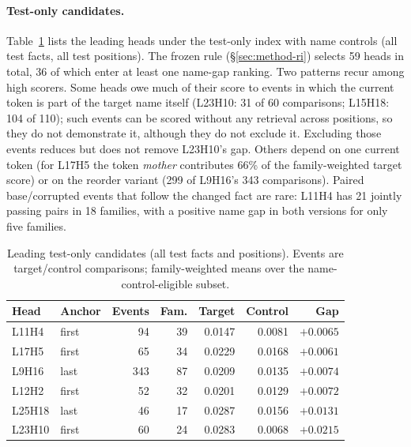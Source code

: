 \paragraph{Test-only candidates.}
Table~\ref{tab:ricands} lists the leading heads under the test-only index with name
controls (all test facts, all test positions). The frozen rule (\S\ref{sec:method-ri})
selects 59 heads in total, 36 of which enter at least one name-gap ranking. Two
patterns recur among high scorers. Some heads owe much of their score to events in
which the current token is part of the target name itself (L23H10: 31 of 60
comparisons; L15H18: 104 of 110); such events can be scored without any retrieval
across positions, so they do not demonstrate it, although they do not exclude it.
Excluding those events reduces but does not remove L23H10's gap. Others depend on one current token (for L17H5 the
token \emph{mother} contributes 66\% of the family-weighted target score) or on the
reorder variant (299 of L9H16's 343 comparisons). Paired base/corrupted events
that follow the changed fact are rare: L11H4 has 21 jointly passing pairs in 18
families, with a positive name gap in both versions for only five families.

\begin{table}[h]
\centering\scriptsize
\setlength{\tabcolsep}{3pt}
\begin{tabular}{@{}llrrrrr@{}}
\toprule
Head & Anchor & Events & Fam. & Target & Control & Gap \\
\midrule
L11H4  & first & 94  & 39 & 0.0147 & 0.0081 & $+0.0065$ \\
L17H5  & first & 65  & 34 & 0.0229 & 0.0168 & $+0.0061$ \\
L9H16  & last  & 343 & 87 & 0.0209 & 0.0135 & $+0.0074$ \\
L12H2  & first & 52  & 32 & 0.0201 & 0.0129 & $+0.0072$ \\
L25H18 & last  & 46  & 17 & 0.0287 & 0.0156 & $+0.0131$ \\
L23H10 & first & 60  & 24 & 0.0283 & 0.0068 & $+0.0215$ \\
\bottomrule
\end{tabular}
\caption{Leading test-only candidates (all test facts and positions). Events are
target/control comparisons; family-weighted means over the name-control-eligible
subset.}
\label{tab:ricands}
\end{table}

